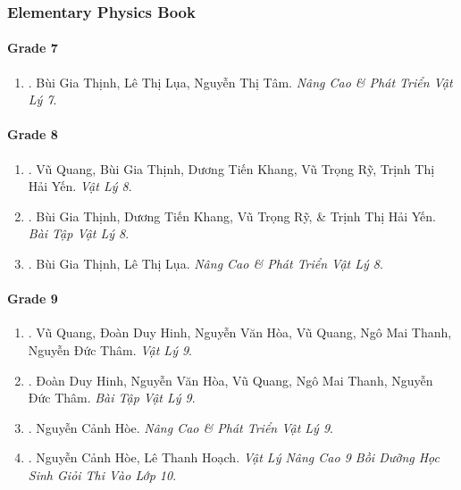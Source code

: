 \documentclass{article}
\begin{document}
\subsubsection{Elementary Physics Book}

\paragraph{Grade 7}

\begin{enumerate}
	\item \cite{Thinh_Lua_ncpt_Vat_Ly_7}. Bùi Gia Thịnh, Lê Thị Lụa, Nguyễn Thị Tâm. {\it Nâng Cao \& Phát Triển Vật Lý 7}.\hfill{\sf[reading]}
\end{enumerate}

\paragraph{Grade 8}

\begin{enumerate}
	\item \cite{SGK_Vat_Ly_8}. Vũ Quang, Bùi Gia Thịnh, Dương Tiến Khang, Vũ Trọng Rỹ, Trịnh Thị Hải Yến. {\it Vật Lý 8}.\hfill{\sf[reading]}

	\item \cite{SBT_Vat_Ly_8}. Bùi Gia Thịnh, Dương Tiến Khang, Vũ Trọng Rỹ, \& Trịnh Thị Hải Yến. {\it Bài Tập Vật Lý 8}.\hfill{\sf[reading]}

	\item \cite{Thinh_Lua_ncpt_Vat_Ly_8}. Bùi Gia Thịnh, Lê Thị Lụa. {\it Nâng Cao \& Phát Triển Vật Lý 8}.\hfill{\sf[reading]}
\end{enumerate}

\paragraph{Grade 9}

\begin{enumerate}
	\item \cite{SGK_Vat_Ly_9}. Vũ Quang, Đoàn Duy Hinh, Nguyễn Văn Hòa, Vũ Quang, Ngô Mai Thanh, Nguyễn Đức Thâm. {\it Vật Lý 9}.\hfill{\sf[reading]}

	\item \cite{SBT_Vat_Ly_9}. Đoàn Duy Hinh, Nguyễn Văn Hòa, Vũ Quang, Ngô Mai Thanh, Nguyễn Đức Thâm. {\it Bài Tập Vật Lý 9}.\hfill{\sf[reading]}

	\item \cite{Hoe_Vat_Ly_9}. Nguyễn Cảnh Hòe. {\it Nâng Cao \& Phát Triển Vật Lý 9}.\hfill{\sf[reading]}

	\item \cite{Hoe_Hoach_Vat_Ly_nang_cao_9}. Nguyễn Cảnh Hòe, Lê Thanh Hoạch. {\it Vật Lý Nâng Cao 9 Bồi Dưỡng Học Sinh Giỏi Thi Vào Lớp 10}.\hfill{\sf[reading]}
\end{enumerate}
\end{document}
